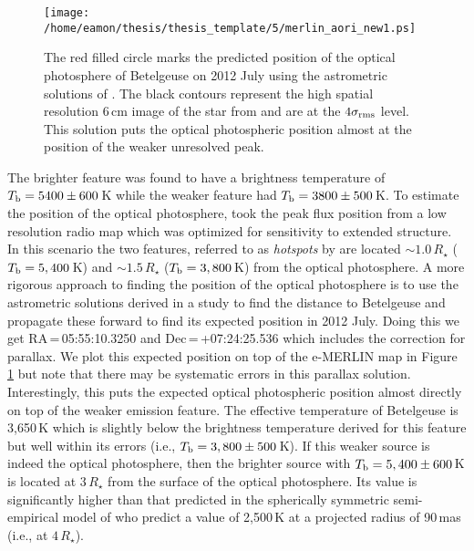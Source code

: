 \begin{figure}[!ht]
\centering 
          \texttt{[image: /home/eamon/thesis/thesis\_template/5/merlin\_aori\_new1.ps]}
\caption[Predicted position of Betelgeuse on 2012 July]{The red filled circle marks the predicted position of the optical photosphere of Betelgeuse on 2012 July using the astrometric solutions of \cite{harper_2001}. The black contours represent the high spatial resolution 6\,cm image of the star from \cite{richards_2013} and are at the $4\sigma _{\rm{rms}}$ level. This solution puts the optical photospheric position almost at the position of the weaker unresolved peak.}
\label{fig:5.14}
\end{figure}

The brighter feature was found to have a brightness temperature of $T_{\rm{b}}=5400\pm 600$\,K while the weaker feature had $T_{\rm{b}}=3800\pm 500$\,K. To estimate the position of the optical photosphere, \cite{richards_2013} took the peak flux position from a low resolution radio map which was optimized for sensitivity to extended structure. In this scenario the two features, referred to as \textit{hotspots} by \cite{richards_2013} are located $\sim 1.0\,R_{\star}$  ($T_{\rm{b}}=5,400$\,K) and $\sim 1.5\,R_{\star}$ ($T_{\rm{b}}=3,800$\,K) from the optical photosphere. A more rigorous approach to finding the position of the optical photosphere is to use the astrometric solutions derived in a study to find the distance to Betelgeuse \citep[Solution 5 in][]{harper_2008} and propagate these forward to find its expected position in 2012 July. Doing this we get RA\,=\,05:55:10.3250 and Dec\,=\,+07:24:25.536 which includes the correction for parallax. We plot this expected position on top of the e-MERLIN map in Figure \ref{fig:5.14} but note that there may be systematic errors in this parallax solution. Interestingly, this puts the expected optical photospheric position almost directly on top of the weaker emission feature. The effective temperature of Betelgeuse is 3,650\,K \citep{levesque_2005} which is slightly below the brightness temperature derived for this feature but well within its errors (i.e., $T_{\rm{b}}=3,800\pm 500$\,K). If this weaker source is indeed the optical photosphere, then the brighter source with $T_{\rm{b}}=5,400\pm 600$\,K is located at $3\,R_{\star}$ from the surface of the optical photosphere. Its value is significantly higher than that predicted in the spherically symmetric semi-empirical model of \cite{harper_2001} who predict a value of 2,500\,K at a projected radius of 90\,mas (i.e., at $4\,R_{\star}$).

